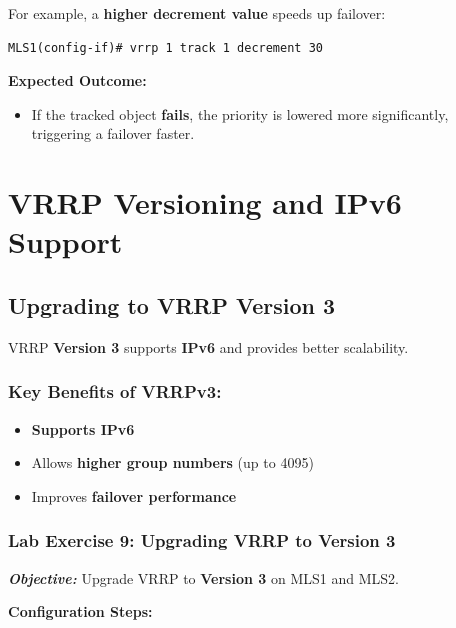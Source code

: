 \documentclass[a4paper]{book}
\begin{document}
For example, a \textbf{higher decrement value} speeds up failover:
\begin{lstlisting}
MLS1(config-if)# vrrp 1 track 1 decrement 30
\end{lstlisting}

\textbf{Expected Outcome:}
\begin{itemize}
\item If the tracked object \textbf{fails}, the priority is lowered more significantly, 
triggering a failover faster.
\end{itemize}


\vspace{1.5em}

\section{VRRP Versioning and IPv6 Support}

\subsection{Upgrading to VRRP Version 3}
VRRP \textbf{Version 3} supports \textbf{IPv6} and provides better scalability.

\subsubsection{Key Benefits of VRRPv3:}
\begin{itemize}
\item \textbf{Supports IPv6}
\item Allows \textbf{higher group numbers} (up to 4095)
\item Improves \textbf{failover performance}
\end{itemize}

\subsubsection{Lab Exercise 9: Upgrading VRRP to Version 3}
\textbf{\textit{Objective:}} Upgrade VRRP to \textbf{Version 3} on MLS1 and MLS2.
\vspace{1.5em}

\textbf{Configuration Steps:}

\vspace{1.5em}

\end{document}
